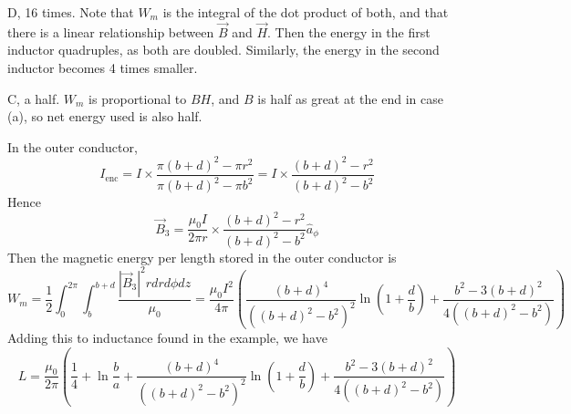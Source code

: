 \documentclass[answers]{exam}
\begin{document}
\begin{questions}
\begin{solution}
    D, 16 times. Note that $W_m$ is the integral of the dot product of both, and that there is a linear relationship between $\vec B$ and $\vec H$. Then the energy in the first inductor quadruples, as both are doubled. Similarly, the energy in the second inductor becomes 4 times smaller.
\end{solution}


\begin{solution}
    C, a half. $W_m$ is proportional to $BH$, and $B$ is half as great at the end in case (a), so net energy used is also half.
\end{solution}


\begin{solution}
    In the outer conductor,
    $$I_\text{enc} = I \times \frac{\pi(b+d)^2 - \pi r^2}{\pi(b+d)^2 - \pi b^2} = I \times \frac{(b+d)^2-r^2}{(b+d)^2-b^2}$$
    Hence
    $$\vec B_3 = \frac{\mu_0I}{2\pi r} \times \frac{(b+d)^2-r^2}{(b+d)^2-b^2} \hat a_\phi$$
    Then the magnetic energy per length stored in the outer conductor is
    $$W_m = \frac{1}{2} \int_0^{2\pi} \int_b^{b+d} \frac{|\vec B_3|^2rdrd\phi dz}{\mu_0} = \frac{\mu_0I^2}{4\pi} \left(\frac{(b+d)^4}{((b+d)^2-b^2)^2} \ln \left(1 + \frac{d}{b}\right) + \frac{b^2-3(b+d)^2}{4((b+d)^2-b^2)}\right)$$
    Adding this to inductance found in the example, we have
    $$L = \frac{\mu_0}{2\pi}\left(\frac{1}{4} + \ln \frac{b}{a} + \frac{(b+d)^4}{((b+d)^2-b^2)^2}\ln\left(1+ \frac{d}{b}\right) + \frac{b^2-3(b+d)^2}{4((b+d)^2-b^2)}\right)$$
\end{solution}



\end{questions}
\end{document}
